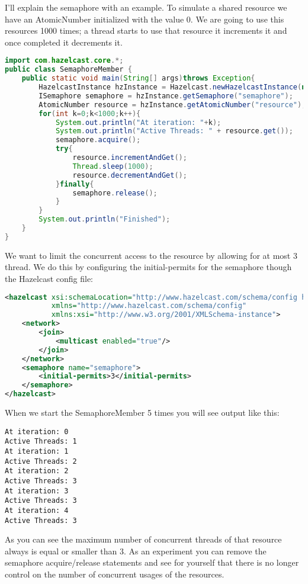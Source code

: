 I'll explain the semaphore with an example. To simulate a shared resource we have an AtomicNumber initialized with the value 0. We are going to use this resources 1000 times; a thread starts to use that resource it increments it and once completed it decrements it.
\begin{lstlisting}[language=java]
import com.hazelcast.core.*;
public class SemaphoreMember {
    public static void main(String[] args)throws Exception{
        HazelcastInstance hzInstance = Hazelcast.newHazelcastInstance(null);
        ISemaphore semaphore = hzInstance.getSemaphore("semaphore");
        AtomicNumber resource = hzInstance.getAtomicNumber("resource");
        for(int k=0;k<1000;k++){
            System.out.println("At iteration: "+k);
            System.out.println("Active Threads: " + resource.get());
            semaphore.acquire();
            try{
                resource.incrementAndGet();
                Thread.sleep(1000);
                resource.decrementAndGet();
            }finally{
                semaphore.release();
            }
        }
        System.out.println("Finished");
    }
}
\end{lstlisting}
We want to limit the concurrent access to the resource by allowing for at most 3 thread. We do this by configuring the initial-permits for the semaphore though the Hazelcast config file:
\begin{lstlisting}[language=xml]
<hazelcast xsi:schemaLocation="http://www.hazelcast.com/schema/config hazelcast-config-2.3.xsd"
           xmlns="http://www.hazelcast.com/schema/config"
           xmlns:xsi="http://www.w3.org/2001/XMLSchema-instance">
    <network>
        <join>
            <multicast enabled="true"/>
        </join>
    </network>
    <semaphore name="semaphore">
        <initial-permits>3</initial-permits>
    </semaphore>
</hazelcast>
\end{lstlisting}
When we start the SemaphoreMember 5 times you will see output like this:
\begin{lstlisting}
At iteration: 0
Active Threads: 1
At iteration: 1
Active Threads: 2
At iteration: 2
Active Threads: 3
At iteration: 3
Active Threads: 3
At iteration: 4
Active Threads: 3
\end{lstlisting}
As you can see the maximum number of concurrent threads of that resource always is equal or smaller than 3. As an experiment you can remove the semaphore acquire/release statements and see for yourself that there is no longer control on the number of concurrent usages of the resources.

